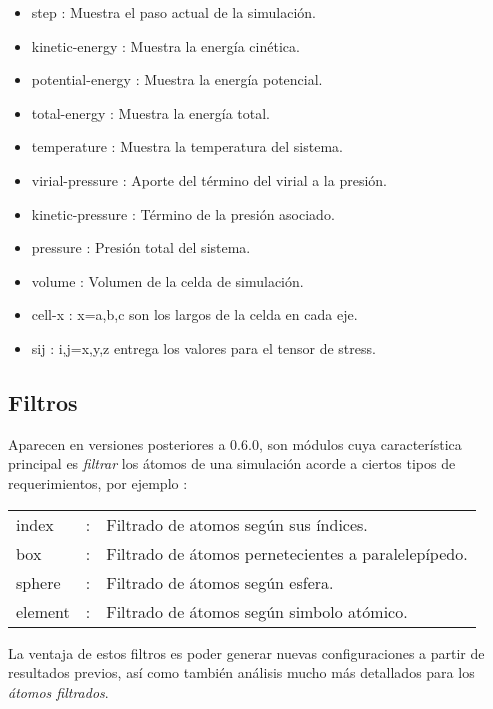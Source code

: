 \begin{itemize}
 \item step : Muestra el paso actual de la simulaci\'on.
 \item kinetic-energy : Muestra la energ\'ia cin\'etica.
 \item potential-energy : Muestra la energ\'ia potencial.
 \item total-energy : Muestra la energ\'ia total.
 \item temperature : Muestra la temperatura del sistema.
 \item virial-pressure : Aporte del t\'ermino del virial a la presi\'on.
 \item kinetic-pressure : T\'ermino de la presi\'on asociado.
 \item pressure : Presi\'on total del sistema.
 \item volume : Volumen de la celda de simulaci\'on.
 \item cell-x : x=a,b,c son los largos de la celda en cada eje.
 \item sij : i,j=x,y,z entrega los valores para el tensor de stress.
\end{itemize}

\subsection{Filtros}

Aparecen en versiones posteriores a 0.6.0, son m\'odulos cuya caracter\'istica
principal es \textit{filtrar} los \'atomos de una simulaci\'on acorde a ciertos
tipos de requerimientos, por ejemplo :

\vspace{1cm}
\begin{center}
\begin{tabular}{lcl}
index &:& Filtrado de atomos seg\'un sus \'indices.\\
box &:& Filtrado de \'atomos pernetecientes a paralelep\'ipedo.\\
sphere &:& Filtrado de \'atomos seg\'un esfera.\\  
element &:& Filtrado de \'atomos seg\'un simbolo at\'omico.\\
\end{tabular}
\end{center}
\vspace{1cm}

La ventaja de estos filtros es poder generar nuevas configuraciones a partir de
resultados previos, as\'i como tambi\'en an\'alisis mucho m\'as detallados para
los \textit{\'atomos filtrados}.

